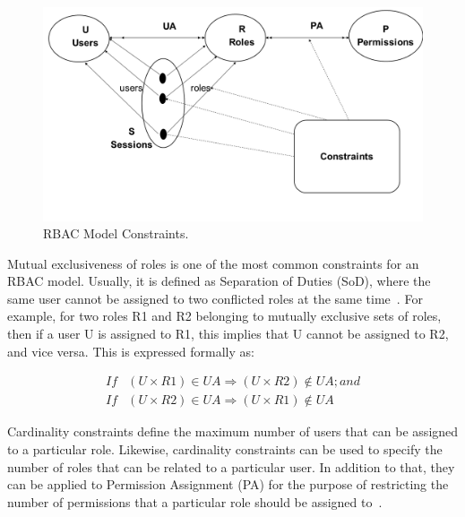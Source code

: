 \begin{figure}[bht]
\centering
\includegraphics[scale=0.26]{modelConstraints.png}
\caption{RBAC Model Constraints.}
\label{fig:RBACPol}
\end{figure}

Mutual exclusiveness of roles is one of the most common constraints for an RBAC model.  Usually, it is defined as Separation of Duties (SoD), where the same user cannot be assigned to two conflicted roles at the same time~\cite{FeKu2009}.  For example, for two roles R1 and R2 belonging to mutually exclusive sets of roles, then if a user U is assigned to R1, this implies that U cannot be assigned to R2, and vice versa.  This is expressed formally as:
  
 
\begin{align*} 
If&  (U \times R1) \in UA \Rightarrow  (U \times R2) \notin UA ;     and \\
If&  (U \times R2) \in UA \Rightarrow (U \times R1) \notin UA
\end{align*}    


Cardinality constraints define the maximum number of users that can be assigned to a particular role.  Likewise, cardinality constraints can be used to specify the number of roles that can be related to a particular user.  In addition to that, they can be applied to Permission Assignment (PA) for the purpose of restricting the number of permissions that a particular role should be assigned to~\cite{SDAG2008}.


